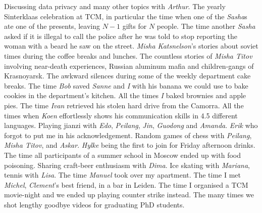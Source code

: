 Discussing data privacy and many other topics with \emph{Arthur}. The yearly Sinterklaas celebration at TCM, in particular the time when one of the \emph{Sasha}s ate one of the presents, leaving $N-1$ gifts for $N$ people. The time another \emph{Sasha} asked if it is illegal to call the police after he was told to stop reporting the woman with a beard he saw on the street. \emph{Misha Katsnelson}'s stories about soviet times during the coffee breaks and lunches. The countless stories of \emph{Misha Titov} involving near-death experiences, Russian aluminum mafia and children-gangs of Krasnoyarsk. The awkward silences during some of the weekly department cake breaks. The time \emph{Bob} saved \emph{Sanne} and \emph{I} with his banana we could use to bake cookies in the department's kitchen. All the times \emph{I} baked brownies and apple pies. The time \emph{Ivan} retrieved his stolen hard drive from the Camorra. All the times when \emph{Koen} effortlessly shows his communication skills in 4.5 different languages. Playing jianzi with \emph{Edo}, \emph{Peilang}, \emph{Jin}, \emph{Guodong} and \emph{Amanda}. \emph{Erik} who forgot to put me in his acknowledgement. Random games of chess with \emph{Peilang}, \emph{Misha Titov}, and \emph{Askar}. \emph{Hylke} being the first to join for Friday afternoon drinks. The time all participants of a summer school in Moscow ended up with food poisoning. Sharing craft-beer enthusiasm with \emph{Dima}. Ice skating with \emph{Mariana}, tennis with \emph{Lisa}. The time \emph{Manuel} took over my apartment. The time I met \emph{Michel}, \emph{Clement}'s best friend, in a bar in Leiden.  
The time I organised a TCM movie-night and we ended up playing counter strike instead. The many times we shot lengthy goodbye videos for graduating PhD students. 

